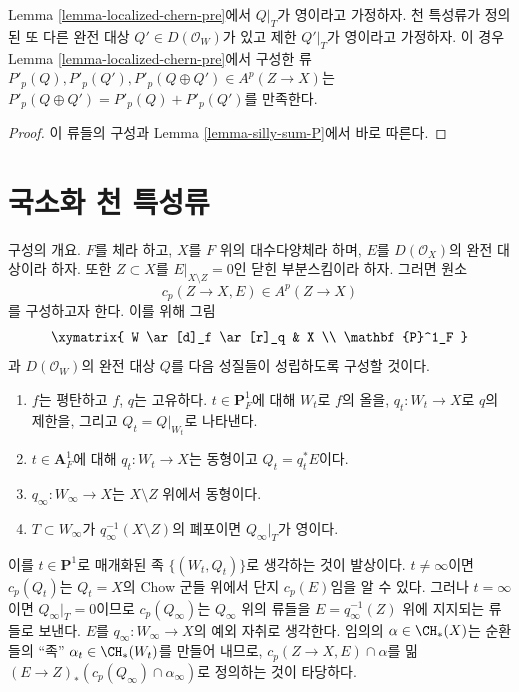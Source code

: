 \begin{lemma}
\label{lemma-localized-chern-pre-sum-P}
Lemma \ref{lemma-localized-chern-pre}에서 $Q|_T$가 영이라고 가정하자.
천 특성류가 정의된 또 다른 완전 대상 $Q' \in D(\mathcal{O}_W)$가 있고
제한 $Q'|_T$가 영이라고 가정하자. 이 경우 Lemma
\ref{lemma-localized-chern-pre}에서 구성한 류
$P'_p(Q), P'_p(Q'), P'_p(Q \oplus Q') \in A^p(Z \to X)$는
$P'_p(Q \oplus Q') = P'_p(Q) + P'_p(Q')$를 만족한다.
\end{lemma}

\begin{proof}
이 류들의 구성과 Lemma \ref{lemma-silly-sum-P}에서 바로 따른다.
\end{proof}









 
\section{국소화 천 특성류}
\label{section-localized-chern}

\noindent
구성의 개요. $F$를 체라 하고, $X$를 $F$ 위의 대수다양체라 하며,
$E$를 $D(\mathcal{O}_X)$의 완전 대상이라 하자. 또한
$Z \subset X$를 $E|_{X \setminus Z} = 0$인 닫힌 부분스킴이라 하자.
그러면 원소
$$
c_p(Z \to X, E) \in A^p(Z \to X)
$$
를 구성하고자 한다. 이를 위해 그림
$$
\xymatrix{
W \ar[d]_f \ar[r]_q & X \\
\mathbf{P}^1_F
}
$$
과 $D(\mathcal{O}_W)$의 완전 대상 $Q$를 다음 성질들이 성립하도록
구성할 것이다.
\begin{enumerate}
\item $f$는 평탄하고 $f$, $q$는 고유하다. $t \in \mathbf{P}^1_F$에
대해 $W_t$로 $f$의 올을, $q_t : W_t \to X$로 $q$의 제한을, 그리고
$Q_t = Q|_{W_t}$로 나타낸다.
\item $t \in \mathbf{A}^1_F$에 대해 $q_t : W_t \to X$는 동형이고
$Q_t = q_t^*E$이다.
\item $q_\infty : W_\infty \to X$는 $X \setminus Z$ 위에서 동형이다.
\item $T \subset W_\infty$가 $q_\infty^{-1}(X \setminus Z)$의 폐포이면
$Q_\infty|_T$가 영이다.
\end{enumerate}
이를 $t \in \mathbf{P}^1$로 매개화된 족 $\{(W_t, Q_t)\}$로 생각하는
것이 발상이다. $t \not = \infty$이면 $c_p(Q_t)$는 $Q_t = X$의 Chow
군들 위에서 단지 $c_p(E)$임을 알 수 있다. 그러나 $t = \infty$이면
$Q_\infty|_T = 0$이므로 $c_p(Q_\infty)$는 $Q_\infty$ 위의 류들을
$E = q_\infty^{-1}(Z)$ 위에 지지되는 류들로 보낸다. $E$를
$q_\infty : W_\infty \to X$의 예외 자취로 생각한다. 임의의
$\alpha \in \CH_*(X)$는 순환들의 ``족'' $\alpha_t \in \CH_*(W_t)$를
만들어 내므로, $c_p(Z \to X, E) \cap \alpha$를 밂
$(E \to Z)_*(c_p(Q_\infty) \cap \alpha_\infty)$로 정의하는 것이
타당하다.


